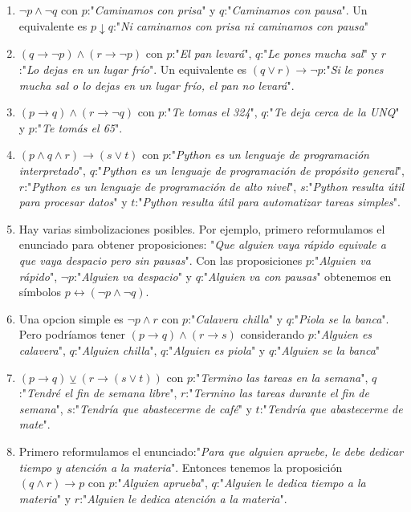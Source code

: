 \documentclass[a4paper]{article}
\newcommand{\then}{\to}
\newcommand{\eq}{\leftrightarrow}
\newcommand{\xor}{\veebar}
\begin{document}
\begin{enumerate}
\begin{enumerate} [label=(\alph*)]
		\item $\neg p  \land  \neg q$ con $p$:"\textit{Caminamos con prisa}" y $q$:"\textit{Caminamos con pausa}". Un equivalente es $p \downarrow  q$:"\textit{Ni caminamos con prisa ni caminamos con pausa}"
		\item $(q\then \neg p)  \land  (r\then \neg p)$ con $p$:"\textit{El pan levará}", $q$:"\textit{Le pones mucha sal}" y $r$:"\textit{Lo dejas en un lugar frío}". Un equivalente es $(q \lor r) \then \neg p$:"\textit{Si le pones mucha sal o lo dejas en un lugar frío, el pan no levará}".
		\item $( p\then q ) \land ( r\then \neg q )$ con $p$:"\textit{Te tomas el 324}", $q$:"\textit{Te deja cerca de la UNQ}" y $p$:"\textit{Te tomás el 65}".  
		\item $( p  \land  q  \land  r ) \then  ( s \lor  t )$ con $p$:"\textit{Python es un lenguaje de programación interpretado}", $q$:"\textit{Python es un lenguaje de programación  de propósito general}", $r$:"\textit{Python es un lenguaje de programación de alto nivel}", $s$:"\textit{Python resulta útil para procesar datos}" y $t$:"\textit{Python resulta útil para automatizar tareas simples}".
		\item Hay varias simbolizaciones posibles. Por ejemplo, primero reformulamos el enunciado para obtener proposiciones: "\textit{Que alguien vaya rápido equivale a que vaya despacio pero sin pausas}". Con las proposiciones $p$:"\textit{Alguien va rápido}", $\neg p$:"\textit{Alguien va despacio}" y $q$:"\textit{Alguien va con pausas}" obtenemos en símbolos $p \eq (\neg p \land \neg q)$.
		\item Una opcion simple es $\neg p  \land  r$ con $p$:"\textit{Calavera chilla}" y $q$:"\textit{Piola se la banca}". Pero podríamos tener $( p\then q )  \land  ( r\then s )$ considerando $p$:"\textit{Alguien es calavera}", $q$:"\textit{Alguien chilla}", $q$:"\textit{Alguien es piola}" y $q$:"\textit{Alguien se la banca}"
		\item $( p \then  q ) \xor  ( r \then  ( s \lor  t) )$ con $p$:"\textit{Termino las tareas en la semana}", $q$:"\textit{Tendré el fin de semana libre}", $r$:"\textit{Termino las tareas durante el fin de semana}", $s$:"\textit{Tendría que abastecerme de café}" y $t$:"\textit{Tendría que abastecerme de mate}".
		\item Primero reformulamos el enunciado:"\textit{Para que alguien apruebe, le debe dedicar tiempo y atención a la materia}". Entonces tenemos la proposición $( q  \land  r ) \then  p$ con $p$:"\textit{Alguien aprueba}", $q$:"\textit{Alguien le dedica tiempo a la materia}" y $r$:"\textit{Alguien le dedica atención a la materia}".

\end{enumerate}
\end{enumerate}
\end{document}
